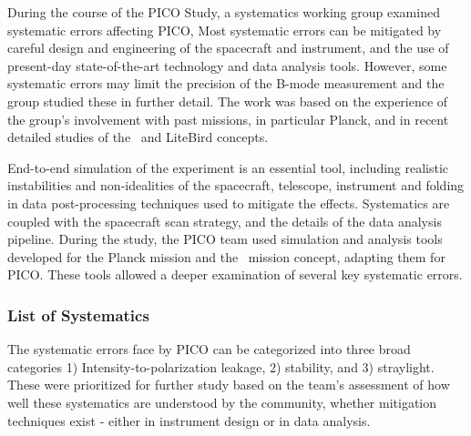 \documentclass[PICOReport.tex]{subfiles}
\begin{document}
During the course of the PICO Study, a systematics working group
examined systematic errors affecting PICO,
Most  systematic errors can be mitigated by careful design and engineering of 
the spacecraft and instrument, and the use of present-day state-of-the-art
technology and data analysis tools.   
However, some systematic errors may
limit the precision of the B-mode measurement and the group studied
these in further detail. 
The work was based on the experience of the group's involvement with
past missions, in particular Planck, and in recent detailed studies of 
the \core\ and LiteBird  concepts.

End-to-end simulation of the experiment is an essential tool,
including realistic instabilities and non-idealities of the spacecraft,
telescope, instrument and folding in data post-processing techniques
used to mitigate the effects.  Systematics are coupled with the
spacecraft scan strategy, and the details of the 
data analysis pipeline.  During the study, the PICO team used 
 simulation and analysis tools developed for the Planck mission\cite{plank2015_xii_focalplane} and 
the \core\ mission concept, adapting them for PICO.  These tools allowed
a deeper examination of several key systematic errors. 

\subsubsection{List of Systematics}
The systematic errors face by PICO can be categorized into three broad categories 
1) Intensity-to-polarization leakage, 2) stability, and 3)
straylight.    These were prioritized for further study based on the
team's assessment of how well these systematics are understood by the
community, whether mitigation techniques exist - either in instrument
design or in data analysis.
\end{document}
